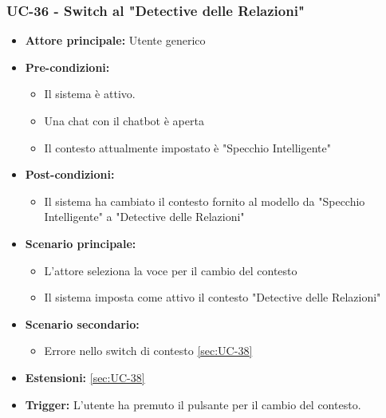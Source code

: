 \documentclass[a4paper,12pt]{article}
\begin{document}
\subsubsection{UC-36 - Switch al "Detective delle Relazioni"} \label{sec:UC-36}
\begin{itemize}
    \item \textbf{Attore principale:} Utente generico
    \item \textbf{Pre-condizioni:}
    \begin{itemize}
        \item Il sistema è attivo.
        \item Una chat con il chatbot è aperta
        \item Il contesto attualmente impostato è "Specchio Intelligente"
    \end{itemize}	
    \item \textbf{Post-condizioni:}
    \begin{itemize}
        \item Il sistema ha cambiato il contesto fornito al modello da "Specchio Intelligente" a "Detective delle Relazioni"
    \end{itemize}
    \item \textbf{Scenario principale:} 
    \begin{itemize}
        \item L'attore seleziona la voce per il cambio del contesto
        \item Il sistema imposta come attivo il contesto "Detective delle Relazioni"
    \end{itemize}
    \item \textbf{Scenario secondario:} 
    \begin{itemize}
        \item Errore nello switch di contesto \ref{sec:UC-38}
    \end{itemize}
    \item \textbf{Estensioni:} \ref{sec:UC-38}
    \item \textbf{Trigger:} L’utente ha premuto il pulsante per il cambio del contesto.
\end{itemize}
\end{document}
